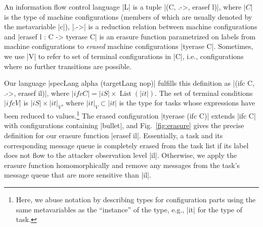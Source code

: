 \begin{definition}
    An information flow control language |L| is a tuple |(C, .->,
    erasef l)|, where $|C|$ is the type of machine configurations (members
    of which are usually denoted by the metavariable |c|), |.->| is a
    reduction relation between machine configurations and |erasef l : C -> tyerase C|
    is an erasure function parametrized on labels from machine configurations to \emph{erased} machine
    configurations |tyerase C|.  Sometimes, we use |V| to refer to set of
     terminal configurations in |C|, i.e., configurations where
     no further transitions are possible.
\end{definition}

Our language |specLang alpha (targetLang nop)| fulfills
this definition as |(ifc C, .->, erasef il)|, where
$|ifc C| = |iS| \times \operatorname{List}(|it|)$.  The set of terminal conditions
$|ifc V|$ is $|iS| \times |it|_V$, where $|it|_V \subset |it|$ is the
type for tasks whose expressions have been reduced to
values.\footnote{
  Here, we abuse notation by describing types for configuration parts using the
  same metavariables as the ``instance'' of the type, e.g., |it| for the type of
  task.
}
The erased configuration |tyerase (ifc C)| extends |ifc C| with configurations
containing |bullet|, and Fig.~\ref{fig:erasure} gives the precise definition for
our erasure function |erasef il|.
%
Essentially, a task and its corresponding message queue is completely erased from the task
list if its label does not flow to the attacker observation level |il|.
Otherwise, we apply the erasure function homomorphically and remove any messages
from the task's message queue that are more sensitive than |il|.

